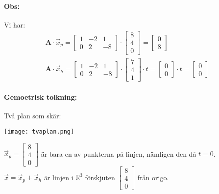 \paragraph{Obs:} %
\label{par:obs_}
Vi har:
\begin{gather*}
    \mathbf{A} \cdot \vec{x}_p = \begin{bmatrix} 1 & -2 & 1\\0 & 2 & -8 \end{bmatrix} \cdot \begin{bmatrix} 8\\4\\0 \end{bmatrix} = \begin{bmatrix} 0\\8 \end{bmatrix}\\
    \mathbf{A} \cdot \vec{x}_h = \begin{bmatrix} 1 & -2 & 1\\0 & 2 & -8 \end{bmatrix} \cdot \begin{bmatrix} 7\\4\\1 \end{bmatrix} \cdot t = \begin{bmatrix} 0\\0 \end{bmatrix} \cdot t = \begin{bmatrix} 0\\0 \end{bmatrix}
\end{gather*}
\paragraph{Gemoetrisk tolkning:} %
\label{par:gemoetrisk_tolkning_}
Två plan som skär:
\begin{center}
    \texttt{[image: tvaplan.png]}
\end{center}
$\vec{x}_p  = \begin{bmatrix} 8\\4\\0 \end{bmatrix}$ är bara en av punkterna på linjen, nämligen den då $t=0$.\\
$\vec{x} = \vec{x}_p + \vec{x}_h$ är linjen i $\mathbb{R}^3$ förskjuten $\begin{bmatrix} 8\\4\\0 \end{bmatrix}$ från origo.
